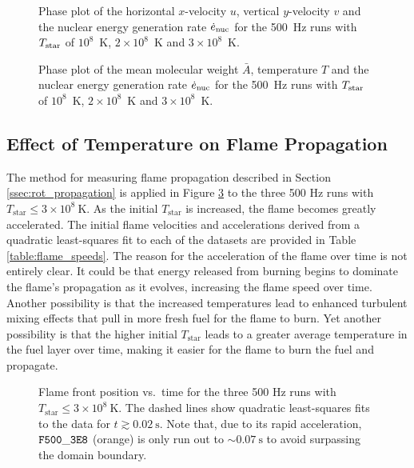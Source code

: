 \documentclass[preprint,times,tighten]{aastex63}
\begin{document}
\begin{figure}[t]
    \centering
    \caption{\label{fig:uv_hot}Phase plot of the horizontal $x$-velocity $u$, vertical $y$-velocity $v$ and the nuclear energy generation rate $\dot{e}_{\rm nuc}$ for the 500~Hz runs with $T_{\rm star}$ of $10^8$~K, $2\times10^8$~K and $3\times10^8$~K.}
\end{figure}

\begin{figure}[t]
    \centering
    \caption{\label{fig:abar_hot}Phase plot of the mean molecular weight $\bar{A}$, temperature $T$ and the nuclear energy generation rate $\dot{e}_{\rm nuc}$ for the 500~Hz runs with $T_{\rm star}$ of $10^8$~K, $2\times10^8$~K and $3\times10^8$~K.}
\end{figure}

\subsection{Effect of Temperature on Flame Propagation}\label{ssec:temp_prop}

The method for measuring flame propagation described in Section \ref{ssec:rot_propagation} is applied in Figure \ref{fig:flame_speeds_2} to the three 500 Hz runs with $T_{\mathrm{star}} \leq 3 \times 10^8~\mathrm{K}$. As the initial $T_{\mathrm{star}}$ is increased, the flame becomes greatly accelerated. The initial flame velocities and accelerations derived from a quadratic least-squares fit to each of the datasets are provided in Table \ref{table:flame_speeds}. The reason for the acceleration of the flame over time is not entirely clear. It could be that energy released from burning begins to dominate the flame's propagation as it evolves, increasing the flame speed over time. Another possibility is that the increased temperatures lead to enhanced turbulent mixing effects that pull in more fresh fuel for the flame to burn. Yet another possibility is that the higher initial $T_{\mathrm{star}}$ leads to a greater average temperature in the fuel layer over time, making it easier for the flame to burn the fuel and propagate.


\begin{figure}[t]
	\centering
	\caption{\label{fig:flame_speeds_2} Flame front position vs.\ time for the three 500 Hz runs with
		$T_{\mathrm{star}} \leq 3 \times 10^8~\mathrm{K}$. The dashed lines show quadratic least-squares fits to the data
		for $t \gtrsim 0.02~\mathrm{s}$. Note that, due to its rapid acceleration, $\tt{F500\_3E8}$ (orange) is only run out to $\sim 0.07~\mathrm{s}$ to avoid surpassing the domain boundary.}
\end{figure}
\end{document}
